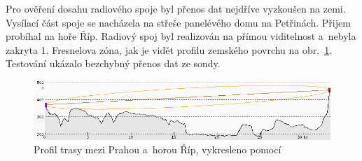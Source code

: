 \documentclass[twoside]{ctuthesis}
\theoremstyle{plain}
\theoremstyle{definition}
\theoremstyle{note}
\begin{document}
	

	Pro ověření dosahu radiového spoje byl přenos dat nejdříve vyzkoušen na zemi. Vysílací část spoje se nacházela na střeše panelévého domu na Petřinách. Přijem probíhal na hoře Říp. Radiový spoj byl realizován na přímou viditelnost a~nebyla zakryta 1. Fresnelova zóna, jak je vidět profilu zemského povrchu na obr.~\ref{fig:praha:rip}. Testování ukázalo bezchybný přenos dat ze sondy.

	\begin{figure}[hbtp]
		\centering
		\includegraphics[width=\textwidth]{Figures/petriny_rip.png}
		\caption{Profil trasy mezi Prahou a~horou Říp, vykresleno pomocí \cite{rozhled}}
		\label{fig:praha:rip}
	\end{figure}








	

	





























	

	
\end{document}
